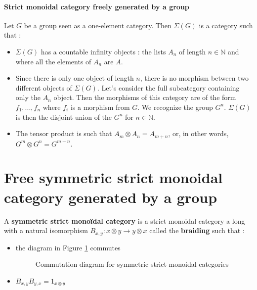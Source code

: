 \documentclass{report}
\begin{document}
\paragraph{Strict monoidal category freely generated by a group}


Let $G$ be a group seen as a one-element category. Then $ \Sigma(G)$ is a category such that :
\begin{itemize}
    \item $\Sigma(G)$ has a countable infinity objects : the lists $A_n$ of length $n \in \mathbb{N}$ and where all the elements of $A_n$ are $A$.
    \item Since there is only one object of length $n$, there is no morphism between two different objects of $\Sigma(G)$. Let's consider the full subcategory containing only the $A_n$ object. Then the morphisms of this category are of the form $f_1,...,f_n$ where $f_i$ is a morphism from $G$. We recognize the group $G^{n}$. $\Sigma (G)$ is then the disjoint union of the $G^{n}$ for $ n\in\mathbb{N}$.
    \item  The tensor product is such that  $A_m \otimes A_n = A_{m+n}$, or, in other words, $G^m \otimes G^n = G^{m+n}$.
\end{itemize}

\section{Free symmetric strict monoidal category generated by a group}
\begin{defn}
    A \textbf{symmetric strict monoïdal category} is a strict monoidal category a long with a natural isomorphism $B_{x,y}: x\otimes y \rightarrow y\otimes x$ called the \textbf{braiding} such that : \begin{itemize}
        \item the diagram in Figure \ref{braid_commut} commutes
              \begin{figure}[ht]
                  \centering
                  \caption{Commutation diagram for symmetric strict monoidal categories}
                  \label{braid_commut}
              \end{figure}

        \item $B_{x,y}B_{y,x} = 1_{x\otimes y}$
    \end{itemize}
\end{defn}
\end{document}
